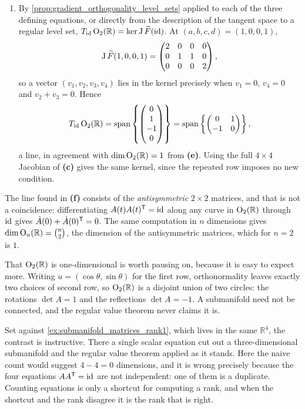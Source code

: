 \begin{exercisesolution}
\begin{enumerate}[label=\textbf{(\alph*)}]
  \item By \cref{prop:gradient_orthogonality_level_sets} applied to each of the three defining
    equations, or directly from the description of the tangent space to a regular level set,
    $T_{\operatorname{id}}\operatorname{O}_2(\mathbb{R}) = \ker \operatorname{J} \widetilde F(\operatorname{id})$. At
    $(a,b,c,d) = (1,0,0,1)$,
\[\operatorname{J} \widetilde F(1,0,0,1) = \begin{pmatrix}
  2 & 0 & 0 & 0 \\
  0 & 1 & 1 & 0 \\
  0 & 0 & 0 & 2
\end{pmatrix},\]
    so a vector $(v_1,v_2,v_3,v_4)$ lies in the kernel precisely when $v_1 = 0$, $v_4 = 0$ and
    $v_2 + v_3 = 0$. Hence
\[T_{\operatorname{id}}\operatorname{O}_2(\mathbb{R}) = \operatorname{span}\left\{
  \begin{pmatrix} 0 \\ 1 \\ -1 \\ 0\end{pmatrix}\right\}
  = \operatorname{span}\left\{\begin{pmatrix} 0 & 1 \\ -1 & 0\end{pmatrix}\right\},\]
    a line, in agreement with $\dim \operatorname{O}_2(\mathbb{R}) = 1$ from \textbf{(e)}. Using the full
    $4\times4$ Jacobian of \textbf{(c)} gives the same kernel, since the repeated row imposes no
    new condition.
\end{enumerate}
\begin{remark}
The line found in \textbf{(f)} consists of the \emph{antisymmetric} $2\times2$ matrices, and that
is not a coincidence: differentiating $A(t)A(t)^{\mathsf{T}} = \operatorname{id}$ along any curve in
$\operatorname{O}_2(\mathbb{R})$ through $\operatorname{id}$ gives $\dot A(0) + \dot A(0)^{\mathsf{T}} = 0$. The same computation
in $n$ dimensions gives $\dim\operatorname{O}_n(\mathbb{R}) = \binom{n}{2}$, the dimension of the
antisymmetric matrices, which for $n=2$ is $1$.

That $\operatorname{O}_2(\mathbb{R})$ is one-dimensional is worth pausing on, because it is easy to expect
more. Writing $u = (\cos\theta,\sin\theta)$ for the first row, orthonormality leaves exactly two
choices of second row, so $\operatorname{O}_2(\mathbb{R})$ is a disjoint union of two circles: the rotations
$\det A = 1$ and the reflections $\det A = -1$. A submanifold need not be connected, and the
regular value theorem never claims it is.

Set against \cref{ex:submanifold_matrices_rank1}, which lives in the same $\mathbb{R}^4$, the
contrast is instructive. There a single scalar equation cut out a three-dimensional submanifold and
the regular value theorem applied as it stands. Here the naive count would suggest
$4 - 4 = 0$ dimensions, and it is wrong precisely because the four equations $AA^{\mathsf{T}} = \operatorname{id}$ are
not independent: one of them is a duplicate. Counting equations is only a shortcut for computing a
rank, and when the shortcut and the rank disagree it is the rank that is right.
\end{remark}
\end{exercisesolution}

